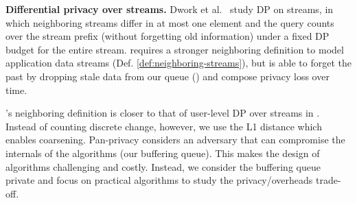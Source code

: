 
\textbf{Differential privacy over streams.}
Dwork et al.~\cite{dwork2010dpcontinual} study DP on streams, in which
neighboring streams differ in at most one element and the query
counts over the stream prefix (without forgetting
old information) under a fixed DP budget for the entire stream.
{\sys} requires a stronger neighboring definition to model application data
streams (Def. \ref{def:neighboring-streams}), but is able to forget the past by
dropping stale data from our queue () and compose
privacy loss over time.

{\sys}'s neighboring definition is closer to that of user-level DP over streams
in \cite{dwork2010pan}. Instead of counting discrete change,
however, we use the L1 distance which enables coarsening.
Pan-privacy considers an adversary that can compromise the internals of
the algorithms (\eg our buffering queue). This makes the design of algorithms
challenging and costly.
Instead, we consider the buffering queue private and focus on
practical algorithms to study the privacy/overheads trade-off.


